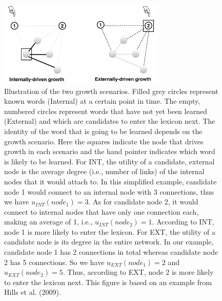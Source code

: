 \documentclass[english,floatsintext,man]{apa6}
\theoremstyle{definition}
\theoremstyle{definition}
\theoremstyle{definition}
\theoremstyle{remark}
\begin{document}
\begin{figure}

{\centering \includegraphics[width=300px]{figs/growth3} 

}

\caption{Illustration of the two growth scenarios. Filled grey circles represent known words (Internal) at a certain point in time. The empty, numbered circles represent words that have not yet been learned (External) and which are candidates to enter the lexicon next. The identity of the word that is going to be learned depends on the growth scenario.  Here the squares indicate the node that drives growth in each scenario and the hand pointer indicates which word is likely to be learned. For INT, the utility of a candidate, external node is the average degree (i.e., number of links) of the internal nodes that it would attach to. In this simplified example, candidate node 1 would connect to an internal node with 3 connections, thus we have $u_{INT}(node_1)= 3$. As for candidate node 2, it would connect to internal nodes that have only one connection each, making an average of 1, i.e., $u_{INT}(node_2)= 1$. According to INT, node 1 is more likely to enter the lexicon. For EXT, the utility of a candidate node is its degree in the entire network. In our example, candidate node 1 has 2 connections in total whereas candidate node 2 has 5 connections. So we have $u_{EXT}(node_1)= 2$ and $u_{EXT}(node_2)= 5$. Thus, according to EXT, node 2 is more likely to enter the lexicon next. This figure is based on an example from Hills et al. (2009).}\label{fig:growth}
\end{figure}
\end{document}
